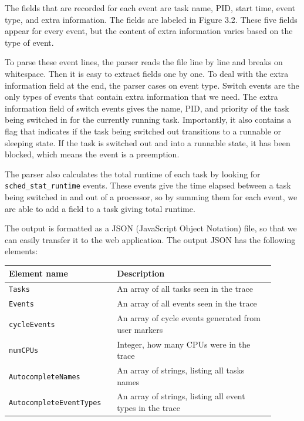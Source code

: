 \documentclass{hmcclinic}
\begin{document}
  The fields that are recorded for each event are task name, PID, start time, 
  event type, and extra information. The fields are labeled in Figure 3.2. 
These five fields appear for every event, but the content of extra information
  varies based on the type of event.

  To parse these event lines, the parser reads the file line by line and breaks on
  whitespace. Then it is easy to extract fields one by one. To deal with the
  extra information field at the end, the parser cases on event type. Switch events
  are the only types of events that contain extra information that we need.  The
  extra information field of switch events gives the name, PID, and priority of
  the task being switched in for the currently running task. Importantly, it
  also contains a flag that indicates if the task being switched out transitions
  to a runnable or sleeping state. If the task is switched out and into a
  runnable state, it has been blocked, which means the event is a preemption.

  The parser also calculates the total runtime of each task by looking for
\texttt{sched\_stat\_runtime} events. These events give the time elapsed between
  a task being switched in and out of a processor, so by summing them for 
  each event, we are able to add a field to a task giving total runtime.

  The output is formatted as a JSON (JavaScript Object Notation) file, so that we can easily transfer it to
  the web application. The output JSON has the following elements:

  \begin{center}
    \begin{tabular}{p{0.35\linewidth}p{0.55\linewidth}}
      \toprule
      Element name        & Description\\
      \midrule
      \texttt{Tasks}      & An array of all tasks seen in the trace\\
       \texttt{Events}     & An array of all events seen in the trace\\
       \texttt{cycleEvents} & An array of cycle events generated from user markers\\
       \texttt{numCPUs}     & Integer, how many CPUs were in the trace\\
       \texttt{AutocompleteNames} & An array of strings, listing all tasks names\\
       \texttt{AutocompleteEventTypes} & An array of strings, listing all event types in the trace\\
      \bottomrule
    \end{tabular}
  \end{center}
\end{document}
